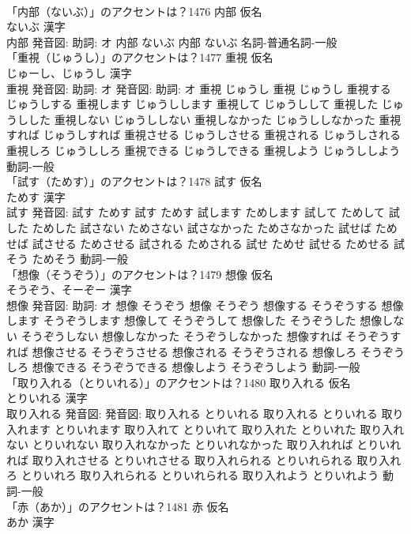 \documentclass[8pt]{extreport}
\begin{document}
\begin{CJK}{UTF8}{min}
\\	「内部（ないぶ）」のアクセントは？1476	内部 仮名　
\\	ないぶ 漢字　
\\	内部 発音図: 助詞: オ	内部 ないぶ		内部 ないぶ				名詞-普通名詞-一般 
\\	「重視（じゅうし）」のアクセントは？1477	重視 仮名　
\\	じゅーし、じゅうし 漢字　
\\	重視 発音図: 助詞: オ 発音図: 助詞: オ	重視 じゅうし		重視 じゅうし 重視する じゅうしする 重視します じゅうしします 重視して じゅうしして 重視した じゅうしした 重視しない じゅうししない 重視しなかった じゅうししなかった 重視すれば じゅうしすれば 重視させる じゅうしさせる 重視される じゅうしされる 重視しろ じゅうししろ 重視できる じゅうしできる 重視しよう じゅうししよう				動詞-一般 
\\	「試す（ためす）」のアクセントは？1478	試す 仮名　
\\	ためす 漢字　
\\	試す 発音図:	試す ためす		試す ためす 試します ためします 試して ためして 試した ためした 試さない ためさない 試さなかった ためさなかった 試せば ためせば 試させる ためさせる 試される ためされる 試せ ためせ 試せる ためせる 試そう ためそう				動詞-一般 
\\	「想像（そうぞう）」のアクセントは？1479	想像 仮名　
\\	そうぞう、そーぞー 漢字　
\\	想像 発音図: 助詞: オ	想像 そうぞう		想像 そうぞう 想像する そうぞうする 想像します そうぞうします 想像して そうぞうして 想像した そうぞうした 想像しない そうぞうしない 想像しなかった そうぞうしなかった 想像すれば そうぞうすれば 想像させる そうぞうさせる 想像される そうぞうされる 想像しろ そうぞうしろ 想像できる そうぞうできる 想像しよう そうぞうしよう				動詞-一般 
\\	「取り入れる（とりいれる）」のアクセントは？1480	取り入れる 仮名　
\\	とりいれる 漢字　
\\	取り入れる 発音図: 発音図:	取り入れる とりいれる		取り入れる とりいれる 取り入れます とりいれます 取り入れて とりいれて 取り入れた とりいれた 取り入れない とりいれない 取り入れなかった とりいれなかった 取り入れれば とりいれれば 取り入れさせる とりいれさせる 取り入れられる とりいれられる 取り入れろ とりいれろ 取り入れられる とりいれられる 取り入れよう とりいれよう				動詞-一般 
\\	「赤（あか）」のアクセントは？1481	赤 仮名　
\\	あか 漢字　

\end{CJK}
\end{document}
